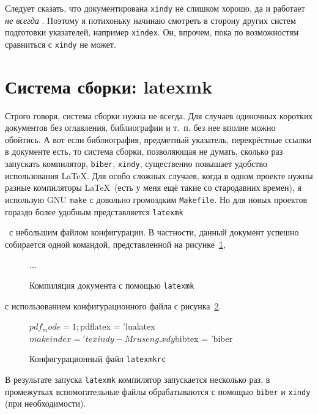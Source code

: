 \documentclass[a4paper,12pt,hyphens]{article}
\newcommand\exe[1]{\texttt{#1}}
\newcommand\file[1]{\texttt{#1}}
\begin{document}
Следует сказать, что документирована \exe{xindy} не слишком хорошо, да и
работает \emph{не всегда} \parencite{se-xindy}. Поэтому я потихоньку начинаю смотреть в сторону
других систем подготовки указателей, например \exe{xindex}. Он, впрочем,
пока по возможностям сравниться с \exe{xindy} не может.

\section{Система сборки: latexmk}
Строго говоря, система сборки нужна не всегда. Для случаев одиночных коротких
документов без оглавления, библиографии и т.~п. без нее вполне можно
обойтись. А вот если библиография, предметный указатель, перекрёстные
ссылки в документе есть, то система сборки, позволяющая не думать, сколько
раз запускать компилятор, \exe{biber}, \exe{xindy}, существенно
повышает удобство использования \LaTeX. Для особо сложных случаев, когда
в одном проекте нужны разные компиляторы \LaTeX\ (есть у меня ещё такие со
стародавних времен), я использую GNU \exe{make} \parencite{site-make}
с довольно громоздким \file{Makefile}. Но для новых проектов гораздо
более удобным представляется
\exe{latexmk} \begin{otherlanguage}{english}\parencite{ctan-latexmk}\end{otherlanguage}\
с небольшим файлом конфигурации. В частности, данный документ успешно
собирается одной командой, представленной на рисунке~\ref{latexmk1},
\begin{figure}[tp]
\begin{shcode}

...

%
\end{shcode}
\caption{Компиляция документа с помощью \exe{latexmk}}\label{latexmk1}
\end{figure}
с использованием конфигурационного файла с рисунка~\ref{latexmk2}.
\begin{figure}[tp]
\begin{latexmkcode}
$pdf_mode = 1;
$pdflatex = 'lualatex %
$makeindex = 'texindy -M ruseng.xdy %
$bibtex = 'biber %
\end{latexmkcode}
\caption{Конфигурационный файл \file{latexmkrc}}\label{latexmk2}
\end{figure}
В результате запуска \exe{latexmk} компилятор запускается несколько раз,
в промежутках вспомогательные файлы обрабатываются с помощью \exe{biber}
и \exe{xindy} (при необходимости).
\end{document}
